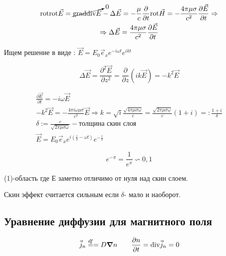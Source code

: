 \begin{gather*}
    \mathrm{rot}\mathrm{rot}\vec{E}=\cancelto{0}{\mathrm{grad}\mathrm{div}\vec{E} }-\Delta\vec{E} =-\frac{\mu}{c}\frac{\partial}{\partial t}\mathrm{rot}\vec{H}=-\frac{4\pi\mu\sigma}{c^2} \frac{\partial\vec{E}}{\partial t}\Rightarrow \\
    \Rightarrow \Delta\vec{E}=\frac {4\pi\mu\sigma} {c^2} \frac{\partial \vec{E}}{\partial t} 
\end{gather*}

Ищем решение в виде : \( \vec{E}=E_0\vec{e}_x e^{-i\omega t}e^{ikt}   \)

\[
\Delta\vec{E}=\frac{\partial^2 \vec{E}}{\partial z^2} =\frac{\partial}{\partial z} (ik\vec{E})=-k^2 \vec{E}
\]

\begin{gather*}
    \frac{\partial\vec{E}}{\partial t}=-i\omega\vec{E} \\
    -k^2\vec{E}=-\frac{4\pi i\omega\mu\sigma}{c^2}\vec{E}\Rightarrow k=\sqrt{i} \frac{\sqrt{4\pi\mu\sigma\omega}}{c} =\frac{\sqrt{2\pi\mu\sigma\omega}}{c}(1+i)=: \frac{1+i}{\delta}  \\
    \boxed{\delta:=\frac{c}{\sqrt{2\pi\mu\sigma\omega}} }-\textit{толщина скин слоя} \\
    \vec{E}=E_0\vec{e}_x e^{i\left( \frac{z}{\delta}-\omega t \right) }e^{-\frac{z}{\delta} }  
\end{gather*}


\[
e^{-\pi}=\frac{1}{e^{\pi} }\backsim 0,1 
\]

(1)-область где Е заметно отличимо от нуля над скин слоем.

Скин эффект считается сильным если \( \delta \)- мало и наоборот.

\subsection*{Уравнение диффузии для
магнитного поля}

\[
\vec{j}_n\overset{df}{=}=D\grad n \qquad \frac{\partial n}{\partial t} =\mathrm{div}\vec{j}_n=0 
\]


